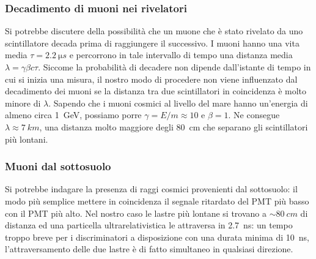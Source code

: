 \subsubsection{Decadimento di muoni nei rivelatori}

Si potrebbe discutere della possibilità che un muone che è stato rivelato da uno scintillatore decada prima di raggiungere il successivo.  I muoni hanno una vita media $\tau=\SI{2.2}{\micro s}$ e percorrono in tale intervallo di tempo una distanza media $\lambda=\gamma\beta c\tau$. Siccome la probabilità di decadere non dipende dall'istante di tempo in cui si inizia una misura, il nostro modo di procedere non viene influenzato dal decadimento dei muoni se la distanza tra due scintillatori in coincidenza è molto minore di $\lambda$.
Sapendo che i muoni cosmici al livello del mare hanno un'energia di almeno circa \SI{1}{GeV}, possiamo porre $\gamma=E/m\approx10$ e $\beta=1$. Ne consegue $\lambda\approx\SI{7}{km}$, una distanza molto maggiore degli \SI{80}{cm} che separano gli scintillatori più lontani.

\subsubsection{Muoni dal sottosuolo}
Si potrebbe indagare la presenza di raggi cosmici provenienti dal sottosuolo: il modo più semplice mettere in coincidenza il segnale ritardato del PMT più basso con il PMT più alto. Nel nostro caso le lastre più lontane si trovano a $\sim\SI{80}{cm}$ di distanza ed una particella ultrarelativistica le attraversa in \SI{2.7}{ns}: un tempo troppo breve per i discriminatori a disposizione con una durata minima di \SI{10}{ns}, l'attraversamento delle due lastre è di fatto simultaneo in qualsiasi direzione.